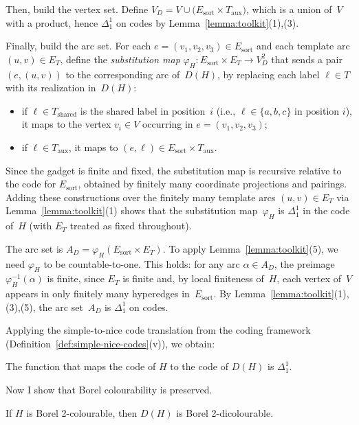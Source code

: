 Then, build the vertex set.
Define $V_D = V \cup \bigl(E_{\mathrm{sort}}\times T_{\mathrm{aux}}\bigr)$, which is a union of~$V$ with a product, hence $\Delta^1_1$ on codes by Lemma~\ref{lemma:toolkit}(1),(3).

Finally, build the arc set.
For each $e = (v_1,v_2,v_3)\in E_{\mathrm{sort}}$ and each template arc $(u,v)\in E_T$, define the \emph{substitution map} $\varphi_H\colon E_{\mathrm{sort}}\times E_T\to V_D^2$ that sends a pair $(e,(u,v))$ to the corresponding arc of~$D(H)$, by replacing each label $\ell\in T$ with its realization in~$D(H)$:
\begin{itemize}[nosep]
	\item if $\ell\in T_{\mathrm{shared}}$ is the shared label in position~$i$ (i.e., $\ell\in\{a,b,c\}$ in position $i$), it maps to the vertex $v_i\in V$ occurring in $e=(v_1,v_2,v_3)$;
	\item if $\ell\in T_{\mathrm{aux}}$, it maps to $(e,\ell)\in E_{\mathrm{sort}}\times T_{\mathrm{aux}}$.
\end{itemize}
Since the gadget is finite and fixed, the substitution map is recursive relative to the code for $E_{\mathrm{sort}}$, obtained by finitely many coordinate projections and pairings.
Adding these constructions over the finitely many template arcs $(u,v)\in E_T$ via Lemma~\ref{lemma:toolkit}(1) shows that the substitution map~$\varphi_H$ is $\Delta^1_1$ in the code of~$H$ (with $E_T$ treated as fixed throughout).

The arc set is $A_D = \varphi_H(E_{\mathrm{sort}}\times E_T)$.
To apply Lemma~\ref{lemma:toolkit}(5), we need $\varphi_H$ to be countable-to-one.
This holds: for any arc $\alpha\in A_D$, the preimage $\varphi_H^{-1}(\alpha)$ is finite, since $E_T$ is finite and, by local finiteness of~$H$, each vertex of~$V$ appears in only finitely many hyperedges in~$E_{\mathrm{sort}}$.
By Lemma~\ref{lemma:toolkit}(1),(3),(5), the arc set~$A_D$ is $\Delta^1_1$ on codes.

Applying the simple-to-nice code translation from the coding framework (Definition~\ref{def:simple-nice-codes}(v)), we obtain:

\begin{lemma}\label{lem:code-reduction}
	The function that maps the code of $H$ to the code of $D(H)$ is $\Delta^1_1$.
\end{lemma}

Now I show that Borel colourability is preserved.

\begin{claim}\label{claim:forward}
	If $H$ is Borel 2-colourable, then $D(H)$ is Borel 2-dicolourable.
\end{claim}

